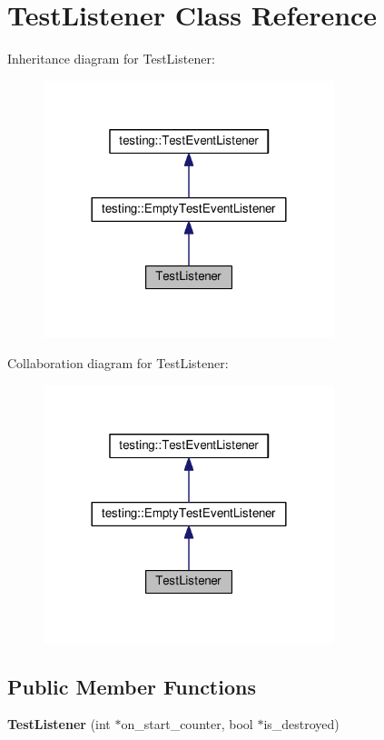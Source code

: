 \hypertarget{class_test_listener}{}\section{Test\+Listener Class Reference}
\label{class_test_listener}


Inheritance diagram for Test\+Listener\+:
\nopagebreak
\begin{figure}[H]
\begin{center}
\leavevmode
\includegraphics[width=240pt]{class_test_listener__inherit__graph}
\end{center}
\end{figure}


Collaboration diagram for Test\+Listener\+:
\nopagebreak
\begin{figure}[H]
\begin{center}
\leavevmode
\includegraphics[width=240pt]{class_test_listener__coll__graph}
\end{center}
\end{figure}
\subsection*{Public Member Functions}
\begin{DoxyCompactItemize}
\item 
\mbox{\label{class_test_listener_ab65604c6c3742c494e9378e770da5d42}} 
{\bfseries Test\+Listener} (int $\ast$on\+\_\+start\+\_\+counter, bool $\ast$is\+\_\+destroyed)
\end{DoxyCompactItemize}
